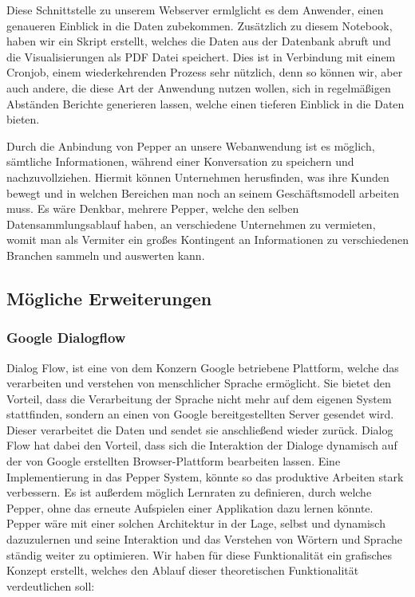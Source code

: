 Diese Schnittstelle zu unserem Webserver ermlglicht es dem Anwender, einen genaueren Einblick in die Daten zubekommen. Zusätzlich zu diesem Notebook, haben wir ein Skript erstellt, welches die Daten aus der Datenbank abruft und die Visualisierungen als PDF Datei speichert. Dies ist in Verbindung mit einem Cronjob, einem wiederkehrenden Prozess sehr nützlich, denn so können wir, aber auch andere, die diese Art der Anwendung nutzen wollen, sich in regelmäßigen Abständen Berichte generieren lassen, welche einen tieferen Einblick in die Daten bieten.

Durch die Anbindung von Pepper an unsere Webanwendung ist es möglich, sämtliche Informationen, während einer Konversation zu speichern und nachzuvollziehen. Hiermit können Unternehmen herusfinden, was ihre Kunden bewegt und in welchen Bereichen man noch an seinem Geschäftsmodell arbeiten muss. Es wäre Denkbar, mehrere Pepper, welche den selben Datensammlungsablauf haben, an verschiedene Unternehmen zu vermieten, womit man als Vermiter ein großes Kontingent an Informationen zu verschiedenen Branchen sammeln und auswerten kann.\\

\subsection{Mögliche Erweiterungen}

\subsubsection{Google Dialogflow}

Dialog Flow, ist eine von dem Konzern Google betriebene Plattform, welche das verarbeiten und verstehen von menschlicher Sprache ermöglicht. Sie bietet den Vorteil, dass die Verarbeitung der Sprache nicht mehr auf dem eigenen System stattfinden, sondern an einen von Google bereitgestellten Server gesendet wird. Dieser verarbeitet die Daten und sendet sie anschließend wieder zurück. Dialog Flow hat dabei den Vorteil, dass sich die Interaktion der Dialoge dynamisch auf der von Google erstellten Browser-Plattform bearbeiten lassen. Eine Implementierung in das Pepper System, könnte so das produktive Arbeiten stark verbessern. Es ist außerdem möglich Lernraten zu definieren, durch welche Pepper, ohne das erneute Aufspielen einer Applikation dazu lernen könnte. Pepper wäre mit einer solchen Architektur in der Lage, selbst und dynamisch dazuzulernen und seine Interaktion und das Verstehen von Wörtern und Sprache ständig weiter zu optimieren. Wir haben für diese Funktionalität ein grafisches Konzept erstellt, welches den Ablauf dieser theoretischen Funktionalität verdeutlichen soll:

